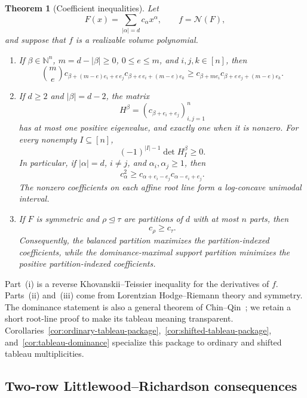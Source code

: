 \documentclass[11pt,a4paper,oneside]{amsart}
\numberwithin{equation}{section}
\newtheorem{theorem}{Theorem}[section]
\theoremstyle{definition}
\theoremstyle{remark}
\newcommand{\N}{\mathbb N}
\newcommand{\cN}{\mathcal N}
\begin{document}
\begin{theorem}[Coefficient inequalities]\label{thm:intro-coefficient-package}
Let
\[
 F(x)=\sum_{|\alpha|=d}c_\alpha x^\alpha,
 \qquad
 f=\cN(F),
\]
and suppose that $f$ is a realizable volume polynomial.
\begin{enumerate}[label=\textup{(\roman*)}]
\item If $\beta\in\N^n$, $m=d-|\beta|\geq0$, $0\leq e\leq m$, and $i,j,k\in[n]$, then
\begin{equation}\label{eq:intro-RKT}
 \binom me
 c_{\beta+(m-e)e_i+e\,e_j}
 c_{\beta+e\,e_i+(m-e)e_k}
 \geq
 c_{\beta+m e_i}
 c_{\beta+e\,e_j+(m-e)e_k}.
\end{equation}
\item If $d\geq2$ and $|\beta|=d-2$, the matrix
\[
 H^\beta=(c_{\beta+e_i+e_j})_{i,j=1}^n
\]
has at most one positive eigenvalue, and exactly one when it is nonzero.  For every nonempty $I\subseteq[n]$,
\[
 (-1)^{|I|-1}\det H_I^\beta\geq0.
\]
In particular, if $|\alpha|=d$, $i\neq j$, and $\alpha_i,\alpha_j\geq1$, then
\[
 c_\alpha^2\geq
 c_{\alpha+e_i-e_j}c_{\alpha-e_i+e_j}.
\]
The nonzero coefficients on each affine root line form a log-concave unimodal interval.
\item If $F$ is symmetric and $\rho\unlhd\tau$ are partitions of $d$ with at most $n$ parts, then
\[
 c_\rho\geq c_\tau.
\]
Consequently, the balanced partition maximizes the partition-indexed coefficients, while the dominance-maximal support partition minimizes the positive partition-indexed coefficients.
\end{enumerate}
\end{theorem}

Part~\textup{(i)} is a reverse Khovanskii--Teissier inequality for the derivatives of $f$.  Parts~\textup{(ii)} and~\textup{(iii)} come from Lorentzian Hodge--Riemann theory and symmetry.  The dominance statement is also a general theorem of Chin--Qin~\cite[Theorem~3.16]{ChinQin25}; we retain a short root-line proof to make its tableau meaning transparent.  Corollaries~\ref{cor:ordinary-tableau-package},~\ref{cor:shifted-tableau-package}, and~\ref{cor:tableau-dominance} specialize this package to ordinary and shifted tableau multiplicities.



\subsection{Two-row Littlewood--Richardson consequences}
\end{document}
